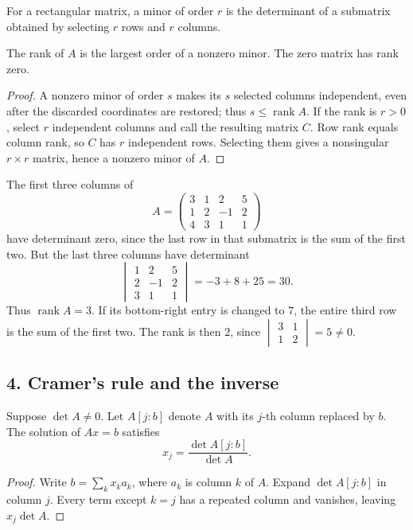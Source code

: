 For a rectangular matrix, a minor of order \(r\) is the determinant of a
submatrix obtained by selecting \(r\) rows and \(r\) columns.

\begin{proposition}
The rank of \(A\) is the largest order of a nonzero minor. The zero matrix
has rank zero.
\end{proposition}
\begin{proof}
A nonzero minor of order \(s\) makes its \(s\) selected columns independent,
even after the discarded coordinates are restored; thus \(s\leqslant
\operatorname{rank}A\). If the rank is \(r>0\), select \(r\) independent
columns and call the resulting matrix \(C\). Row rank equals column rank,
so \(C\) has \(r\) independent rows. Selecting them gives a nonsingular
\(r\times r\) matrix, hence a nonzero minor of \(A\).
\end{proof}

\begin{example}
The first three columns of
\[
 A=\begin{pmatrix}3&1&2&5\\1&2&-1&2\\4&3&1&1\end{pmatrix}
\]
have determinant zero, since the last row in that submatrix is the sum of
the first two. But the last three columns have determinant
\[
 \begin{vmatrix}1&2&5\\2&-1&2\\3&1&1\end{vmatrix}
 =-3+8+25=30.
\]
Thus \(\operatorname{rank}A=3\).
If its bottom-right entry is changed to \(7\), the entire third row is the
sum of the first two. The rank is then \(2\), since
\(\begin{vmatrix}3&1\\1&2\end{vmatrix}=5\ne0\).
\end{example}

\subsection*{4. Cramer's rule and the inverse}
\begin{theorem}
Suppose \(\det A\ne0\). Let \(A[j:b]\) denote \(A\) with its \(j\)-th
column replaced by \(b\). The solution of \(Ax=b\) satisfies
\[
 x_j=\frac{\det A[j:b]}{\det A}.
\]
\end{theorem}
\begin{proof}
Write \(b=\sum_k x_k a_k\), where \(a_k\) is column \(k\) of \(A\).
Expand \(\det A[j:b]\) in column \(j\). Every term except \(k=j\)
has a repeated column and vanishes, leaving \(x_j\det A\).
\end{proof}

